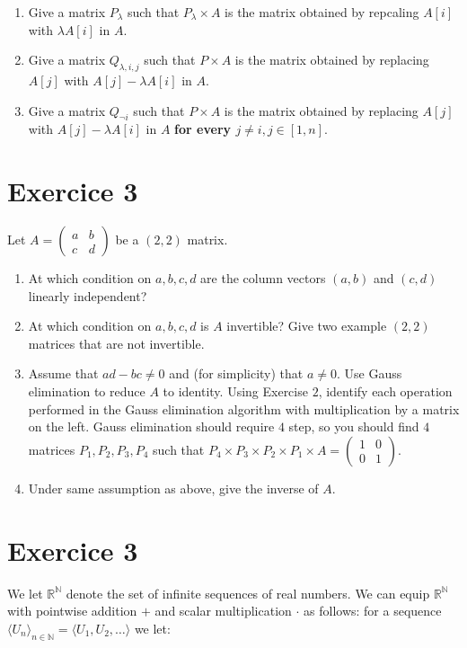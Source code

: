 \documentclass{article}
\begin{document}
\begin{enumerate}
\item Give a matrix $P_{\lambda}$ such that $P_{\lambda} \times A$ is the matrix obtained by repcaling $A[i]$ with $\lambda A[i]$ in $A$.
\item Give a matrix $Q_{\lambda, i, j}$ such that $P \times A$ is the matrix obtained by replacing $A[j]$ with $A[j] - \lambda A[i]$ in $A$.
\item Give a matrix $Q_{\neg i}$ such that $P \times A$ is the matrix obtained by replacing $A[j]$ with $A[j] - \lambda A[i]$ in $A$ \textbf{for every $j \neq i, j \in [1,n]$}.
\end{enumerate}

\section*{Exercice 3}
Let $A= \begin{pmatrix} a & b \\ c & d \end{pmatrix}$ be a $(2,2)$ matrix.
\begin{enumerate}
\item At which condition on $a,b,c,d$ are the column vectors $(a,b)$ and $(c,d)$ linearly independent?
\item At which condition on $a,b,c,d$ is $A$ invertible? Give two example $(2,2)$ matrices that are not invertible. 
\item Assume that $ad-bc \neq 0$ and (for simplicity) that $a \neq 0$. Use Gauss elimination to reduce $A$ to identity. Using Exercise $2$, identify each operation performed in the Gauss elimination algorithm with multiplication by a matrix on the left. Gauss elimination should require $4$ step, so you should find $4$ matrices $P_1, P_2, P_3, P_4$ such that $P_4 \times P_3 \times P_2 \times P_1 \times A = \begin{pmatrix}1 & 0 \\ 0 & 1 \end{pmatrix}$.
\item Under same assumption as above, give the inverse of $A$.
\end{enumerate}



\section*{Exercice 3}

We let $\mathbb{R}^{\mathbb{N}}$ denote the set of infinite sequences of real numbers. We can equip $\mathbb{R}^{\mathbb{N}}$ with pointwise addition ${+}$ and scalar multiplication ${\cdot}$ as follows: for a sequence $\langle U_n \rangle_{n \in \mathbb{N}} = \langle U_1, U_2, \dots \rangle$ we let:
\end{document}
